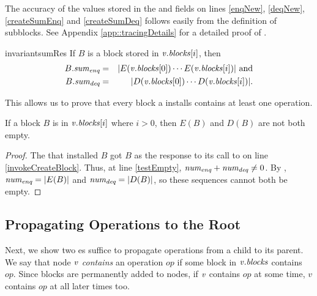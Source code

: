 The accuracy of the values stored in the  and  fields
on lines \ref{enqNew}, \ref{deqNew}, \ref{createSumEnq} and \ref{createSumDeq} follows easily
from the definition of subblocks.  See Appendix 
\ref{app::tracingDetails} for a detailed proof of .

\begin{restatable}{invariant}{sumRes}
\label{lem::sum}
If $B$ is a block stored in $\mbox{\textnormal{\textit{v}}}.\mbox{\textit{blocks}}[i]$, then
\begin{eqnarray*}
B.\mbox{\textit{sum\textsubscript{enq}}} &=& | E(\mbox{\textnormal{\textit{v}}}.\mbox{\textit{blocks}}[0])\cdots E(\mbox{\textnormal{\textit{v}}}.\mbox{\textit{blocks}}[i]) | \mbox{ and}\\
B.\mbox{\textit{sum\textsubscript{deq}}} &=& | D(\mbox{\textnormal{\textit{v}}}.\mbox{\textit{blocks}}[0])\cdots D(\mbox{\textnormal{\textit{v}}}.\mbox{\textit{blocks}}[i]) |.
\end{eqnarray*}
\end{restatable}

This allows us to prove that every block a  installs contains at least one operation.

\begin{corollary}\label{blockNotEmpty}
If a block $B$ is in $\mbox{\textnormal{\textit{v}}}.\mbox{\textit{blocks}}[i]$ where $i>0$, then $E(B)$ and $D(B)$ are not both empty.
\end{corollary}
\begin{proof}
The  that installed $B$ got $B$ as the response to its call to  on line \ref{invokeCreateBlock}.
Thus, at line \ref{testEmpty}, $\mbox{\textnormal{\textit{num\textsubscript{enq}}}}+\mbox{\textnormal{\textit{num\textsubscript{deq}}}}\neq 0$.
By , $\mbox{\textnormal{\textit{num\textsubscript{enq}}}} = |E(B)|$ and $\mbox{\textnormal{\textit{num\textsubscript{deq}}}} = |D(B)|$,
so these sequences cannot both be empty.
\end{proof}



\subsection{Propagating Operations to the Root}
\label{sec::propagating}

Next, we show two es suffice to propagate operations from a child to its parent.
We say that node $\mbox{\textnormal{\textit{v}}}$ \emph{contains} an operation $op$ if some block in $\mbox{\textnormal{\textit{v}}}.\mbox{\textit{blocks}}$ contains $op$.
Since blocks are permanently added to nodes, if $\mbox{\textnormal{\textit{v}}}$ contains $op$ at some time, $v$ contains $op$ at all later times too.

